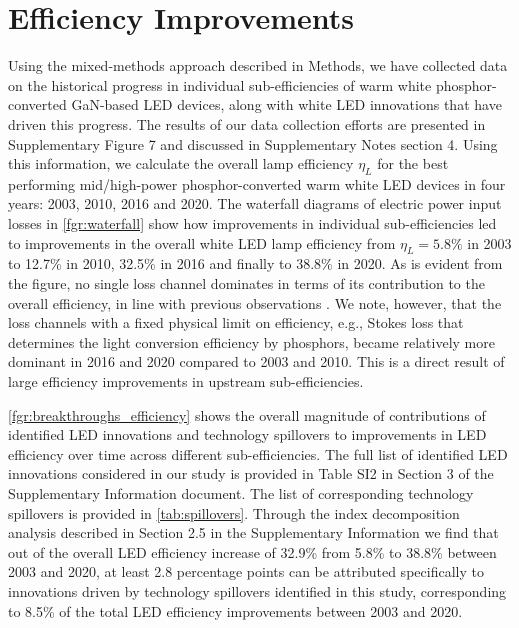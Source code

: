 \documentclass[parskip=full]{article}
\begin{document}
\clearpage

\section{Efficiency Improvements}

Using the mixed-methods approach described in Methods, we have collected data on the historical progress in individual sub-efficiencies of warm white phosphor-converted GaN-based LED devices, along with white LED innovations that have driven this progress. The results of our data collection efforts are presented in Supplementary Figure 7 and discussed in Supplementary Notes section 4. Using this information, we calculate the overall lamp efficiency $\eta_L$ for the best performing mid/high-power phosphor-converted warm white LED devices in four years: 2003, 2010, 2016 and 2020. The waterfall diagrams of electric power input losses in \cref{fgr:waterfall} show how improvements in individual sub-efficiencies led to improvements in the overall white LED lamp efficiency from $\eta_L=5.8\%$ in 2003 to 12.7\% in 2010, 32.5\% in 2016 and finally to 38.8\% in 2020. As is evident from the figure, no single loss channel dominates in terms of its contribution to the overall efficiency, in line with previous observations \cite{tsao2010solid}. We note, however, that the loss channels with a fixed physical limit on efficiency, e.g., Stokes loss that determines the light conversion efficiency by phosphors, became relatively more dominant in 2016 and 2020 compared to 2003 and 2010.  This is a direct result of large efficiency improvements in upstream sub-efficiencies.

\cref{fgr:breakthroughs_efficiency} shows the overall magnitude of contributions of identified LED innovations and technology spillovers to improvements in LED efficiency over time across different sub-efficiencies. The full list of identified LED innovations considered in our study is provided in Table SI2 in Section 3 of the Supplementary Information document. The list of corresponding technology spillovers is provided in \cref{tab:spillovers}. Through the index decomposition analysis described in Section 2.5 in the Supplementary Information we find that out of the overall LED efficiency increase of 32.9\% from 5.8\% to 38.8\% between 2003 and 2020, at least 2.8 percentage points can be attributed specifically to innovations driven by technology spillovers identified in this study, corresponding to 8.5\% of the total LED efficiency improvements between 2003 and 2020.
\end{document}
